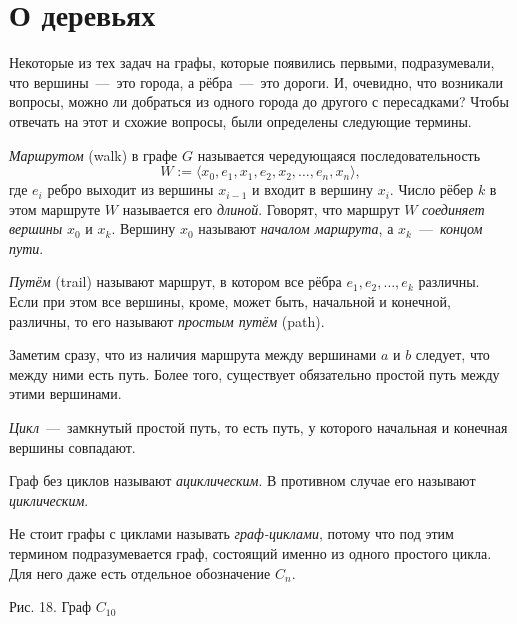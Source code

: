 \newpage
\section{О деревьях}

	Некоторые из тех задач на графы, которые появились первыми, подразумевали, что вершины~---~это города, а рёбра~---~это дороги. И, очевидно, что возникали вопросы, можно ли добраться из одного города до другого с пересадками? Чтобы отвечать на этот и схожие вопросы, были определены следующие термины.
	
\begin{definition}
	\emph{Маршрутом} (walk) в графе $G$ называется чередующаяся последовательность 
	$$W := \langle x_0, e_1, x_1, e_2, x_2,\dots, e_n, x_n\rangle,$$
	где $e_i$ ребро выходит из вершины $x_{i-1}$ и входит в вершину $x_{i}$. Число рёбер $k$ в этом маршруте $W$ называется его \emph{длиной}. Говорят, что маршрут $W$ \emph{соединяет вершины} $x_0$ и $x_k$. Вершину $x_0$ называют \emph{началом маршрута}, а $x_k$~---~\emph{концом пути}.
\end{definition}

\begin{definition}
	\emph{Путём} (trail) называют маршрут, в котором все рёбра $e_1, e_2, \dots, e_k$ различны. Если при этом все вершины, кроме, может быть, начальной и конечной, различны, то его называют \emph{простым путём} (path).
\end{definition}
	
	Заметим сразу, что из наличия маршрута между вершинами $a$ и $b$ следует, что между ними есть путь. Более того, существует обязательно простой путь между этими вершинами.

\begin{paracol}{2}
\begin{definition}
	\emph{Цикл}~---~замкнутый простой путь, то есть путь, у которого начальная и конечная вершины совпадают.
\end{definition}

\begin{definition}
	Граф без циклов называют \emph{ациклическим}. В противном случае его называют \emph{циклическим}.
\end{definition}

	Не стоит графы с циклами называть \emph{граф-циклами}, потому что под этим термином подразумевается граф, состоящий именно из одного простого цикла. Для него даже есть отдельное обозначение $C_n$.
\switchcolumn

\begin{center}\end{center}
\begin{center}
	\small Рис. 18. Граф $C_{10}$
\end{center}\end{paracol}

